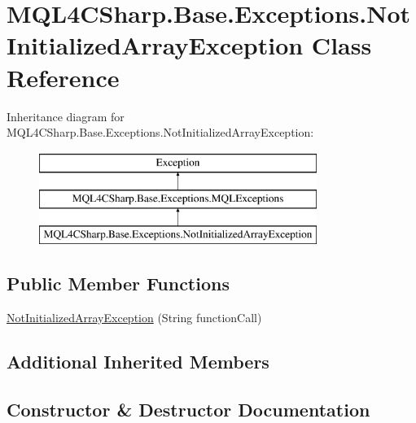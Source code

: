 \hypertarget{class_m_q_l4_c_sharp_1_1_base_1_1_exceptions_1_1_not_initialized_array_exception}{}\section{M\+Q\+L4\+C\+Sharp.\+Base.\+Exceptions.\+Not\+Initialized\+Array\+Exception Class Reference}
\label{class_m_q_l4_c_sharp_1_1_base_1_1_exceptions_1_1_not_initialized_array_exception}
Inheritance diagram for M\+Q\+L4\+C\+Sharp.\+Base.\+Exceptions.\+Not\+Initialized\+Array\+Exception\+:\begin{figure}[H]
\begin{center}
\leavevmode
\includegraphics[height=3.000000cm]{class_m_q_l4_c_sharp_1_1_base_1_1_exceptions_1_1_not_initialized_array_exception}
\end{center}
\end{figure}
\subsection*{Public Member Functions}
\begin{DoxyCompactItemize}
\item 
\hyperlink{class_m_q_l4_c_sharp_1_1_base_1_1_exceptions_1_1_not_initialized_array_exception_a1462390fdb32d0c49d470a99e7d5db85}{Not\+Initialized\+Array\+Exception} (String function\+Call)
\end{DoxyCompactItemize}
\subsection*{Additional Inherited Members}


\subsection{Constructor \& Destructor Documentation}
